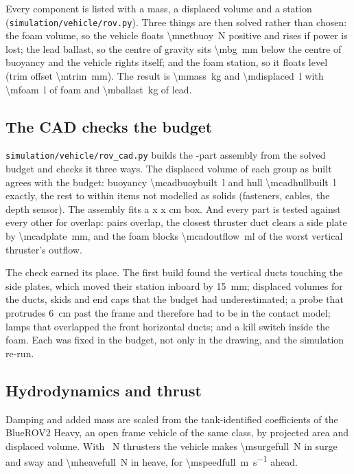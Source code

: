 \documentclass[10pt,a4paper]{article}
\begin{document}
Every component is listed with a mass, a displaced volume and a station
(\texttt{simulation/vehicle/rov.py}). Three things are then solved rather than chosen: the
foam volume, so the vehicle floats \SI{\mnetbuoy}{\newton} positive and rises
if power is lost; the lead ballast, so the centre of gravity sits
\SI{\mbg}{\milli\metre} below the centre of buoyancy and the vehicle rights
itself; and the foam station, so it floats level (trim offset
\SI{\mtrim}{\milli\metre}). The result is \SI{\mmass}{\kilo\gram} and
\SI{\mdisplaced}{\litre} with \SI{\mfoam}{\litre} of foam and
\SI{\mballast}{\kilo\gram} of lead.

\subsection{The CAD checks the budget}

\texttt{simulation/vehicle/rov\_cad.py} builds the \mcadparts{}-part assembly from the solved
budget and checks it three ways. The displaced volume of each group as built
agrees with the budget: buoyancy \SI{\mcadbuoybuilt}{\litre} and hull
\SI{\mcadhullbuilt}{\litre} exactly, the rest to within items not modelled as
solids (fasteners, cables, the depth sensor). The assembly fits a
\mcadenvl{} x \mcadenvb{} x \mcadenvh{} cm box. And every part is tested
against every other for overlap: \mcadclash{} pairs overlap, the closest
thruster duct clears a side plate by \SI{\mcadplate}{\milli\metre}, and the
foam blocks \SI{\mcadoutflow}{\milli\litre} of the worst vertical thruster's
outflow.

The check earned its place. The first build found the vertical ducts
touching the side plates, which moved their station inboard by
\SI{15}{\milli\metre}; displaced volumes for the ducts, skids and end caps
that the budget had underestimated; a probe that protrudes
\SI{6}{\centi\metre} past the frame and therefore had to be in the contact
model; lamps that overlapped the front horizontal ducts; and a kill switch
inside the foam. Each was fixed in the budget, not only in the drawing, and
the simulation re-run.

\subsection{Hydrodynamics and thrust}

Damping and added mass are scaled from the tank-identified coefficients of
the BlueROV2 Heavy, an open frame vehicle of the same class, by projected area and
displaced volume. With \mthrustmax{}~N thrusters the vehicle makes
\SI{\msurgefull}{\newton} in surge and sway and \SI{\mheavefull}{\newton} in
heave, for \SI{\mspeedfull}{\metre\per\second} ahead.
\end{document}
